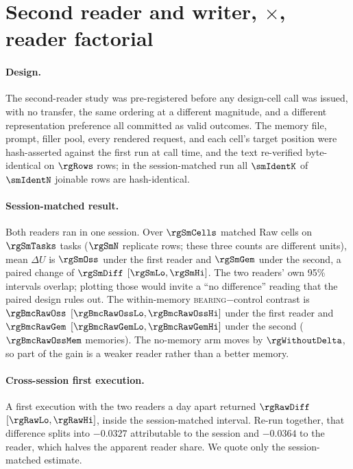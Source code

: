 \section{Second reader and writer, $\times$, reader factorial}
\label{sec:readerfull}

\paragraph{Design.}
The second-reader study was pre-registered before any design-cell call was
issued, with no transfer, the same ordering at a different magnitude, and a
different representation preference all committed as valid outcomes. The
memory file, prompt, filler pool, every rendered request, and each cell's
target position were hash-asserted against the first run at call time, and
the text re-verified byte-identical on $\rgRows$ rows; in the session-matched
run all $\smIdentK$ of $\smIdentN$ joinable rows are hash-identical.

\paragraph{Session-matched result.}
Both readers ran in one session. Over $\rgSmCells$ matched Raw cells on
$\rgSmTasks$ tasks ($\rgSmN$ replicate rows; these three counts are different
units), mean $\Delta U$ is $\rgSmOss$ under the first reader and $\rgSmGem$
under the second, a paired change of $\rgSmDiff$ $[\rgSmLo, \rgSmHi]$. The
two readers' own 95\% intervals overlap; plotting those would invite a ``no
difference'' reading that the paired design rules out. The within-memory
\textsc{bearing}$-$control contrast is $\rgBmcRawOss$ $[\rgBmcRawOssLo,
\rgBmcRawOssHi]$ under the first reader and $\rgBmcRawGem$ $[\rgBmcRawGemLo,
\rgBmcRawGemHi]$ under the second ($\rgBmcRawOssMem$ memories). The no-memory
arm moves by $\rgWithoutDelta$, so part of the gain is a weaker reader rather
than a better memory.

\paragraph{Cross-session first execution.}
A first execution with the two readers a day apart returned $\rgRawDiff$
$[\rgRawLo, \rgRawHi]$, inside the session-matched interval. Re-run together,
that difference splits into $-0.0327$ attributable to the session and
$-0.0364$ to the reader, which halves the apparent reader share. We quote only
the session-matched estimate.

